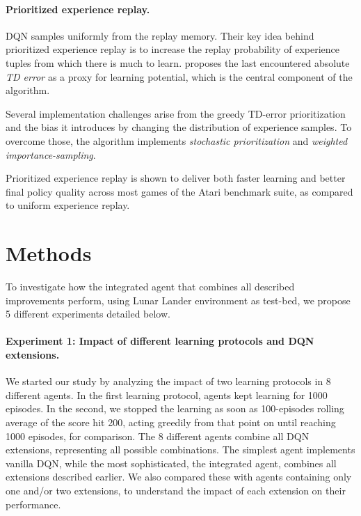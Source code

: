 \documentclass{article}
\begin{document}
    \paragraph{Prioritized experience replay.}
    DQN samples uniformly from the replay memory.
    Their key idea behind prioritized experience replay is to increase the replay probability of experience tuples from which there is much to learn.
    \cite{per} proposes the last encountered absolute \emph{TD error} as a proxy for learning potential, which is the central component of the algorithm.

    Several implementation challenges arise from the greedy TD-error prioritization and the bias it introduces by changing the distribution of experience samples.
    To overcome those, the algorithm implements \emph{stochastic prioritization} and \emph{weighted importance-sampling}.

    Prioritized experience replay is shown to deliver both faster learning and better final policy quality across most games of the Atari benchmark suite, as compared to uniform experience replay.

    \section{Methods}
    \label{sec:methods}
    To investigate how the integrated agent that combines all described improvements perform, using Lunar Lander environment as test-bed, we propose 5 different experiments detailed below.

    \paragraph{Experiment 1: Impact of different learning protocols and DQN extensions.}
    We started our study by analyzing the impact of two learning protocols in 8 different agents.
    In the first learning protocol, agents kept learning for 1000 episodes.
    In the second, we stopped the learning as soon as 100-episodes rolling average of the score hit 200, acting greedily from that point on until reaching 1000 episodes, for comparison.
    The 8 different agents combine all DQN extensions, representing all possible combinations.
    The simplest agent implements vanilla DQN, while the most sophisticated, the integrated agent, combines all extensions described earlier.
    We also compared these with agents containing only one and/or two extensions, to understand the impact of each extension on their performance.
\end{document}
